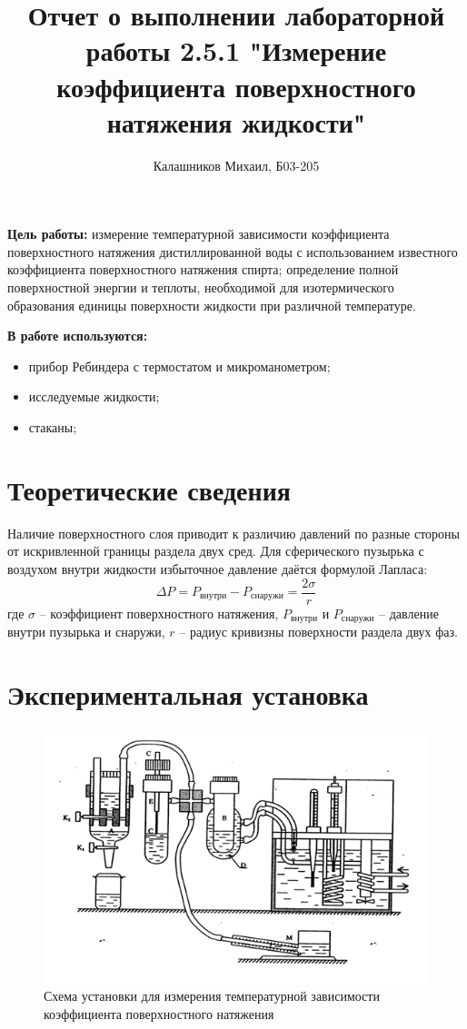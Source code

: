 \documentclass[14pt, a4paper]{report}
\title{\textbf{Отчет о выполнении лабораторной работы 2.5.1 "Измерение коэффициента поверхностного натяжения жидкости"}}
\author{Калашников Михаил, Б03-205}
\date{}
\begin{document}
\maketitle

\textbf{Цель работы:}
измерение температурной зависимости коэффициента поверхностного натяжения дистиллированной воды с использованием известного коэффициента поверхностного натяжения спирта; определение полной поверхностной энергии и теплоты, необходимой для изотермического образования единицы поверхности жидкости при различной температуре.
\newline

\textbf{В работе используются:}
\begin{itemize}
\item прибор Ребиндера с термостатом и микроманометром;
\item исследуемые жидкости;
\item стаканы;
\end{itemize}

\section{Теоретические сведения}

Наличие поверхностного слоя приводит к различию давлений по разные стороны от искривленной границы раздела двух сред. Для сферического пузырька с воздухом внутри жидкости избыточное давление даётся формулой Лапласа:
\[\Delta P=P_{внутри}-P_{снаружи}=\frac{2\sigma}{r}\]
где $\sigma$ – коэффициент поверхностного натяжения, $P_{внутри}$ и $P_{снаружи}$ – давление внутри пузырька и снаружи, $r$ -- радиус кривизны поверхности раздела двух фаз.

\section{Экспериментальная установка}

\begin{figure}[!ht]
\centering
\includegraphics[scale=0.6]{terma7_01.png}
\caption{Схема установки для измерения температурной зависимости коэффициента поверхностного натяжения}
\end{figure}
\end{document}
